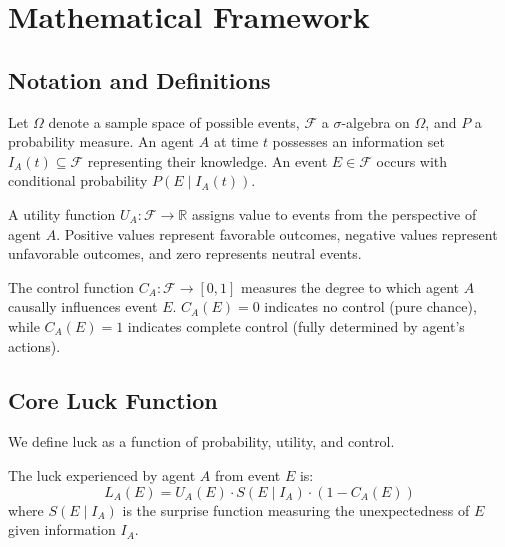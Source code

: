 \section{Mathematical Framework}
\label{sec:theory}

\subsection{Notation and Definitions}

Let $\Omega$ denote a sample space of possible events, $\mathcal{F}$ a $\sigma$-algebra
on $\Omega$, and $P$ a probability measure. An agent $A$ at time $t$ possesses
an information set $I_{A}(t) \subseteq \mathcal{F}$ representing their knowledge.
An event $E \in \mathcal{F}$ occurs with conditional probability
$P(E \mid I_{A}(t))$.

\begin{definition}
  A utility function $U_{A}: \mathcal{F}\to \mathbb{R}$ assigns value to
  events from the perspective of agent $A$. Positive values represent
  favorable outcomes, negative values represent unfavorable outcomes,
  and zero represents neutral events.
\end{definition}

\begin{definition}[Control]
  The control function $C_{A}: \mathcal{F}\to [0,1]$ measures the degree
  to which agent $A$ causally influences event $E$. $C_{A}(E) = 0$
  indicates no control (pure chance), while $C_{A}(E) = 1$ indicates complete
  control (fully determined by agent's actions).
\end{definition}

\subsection{Core Luck Function}

We define luck as a function of probability, utility, and control.

\begin{definition}[Luck]
  \label{def:luck} The luck experienced by agent $A$ from event $E$ is:
  \begin{equation}
    L_{A}(E) = U_{A}(E) \cdot S(E \mid I_{A}) \cdot (1 - C_{A}(E))
  \end{equation}
  where $S(E \mid I_{A})$ is the surprise function measuring the
  unexpectedness of $E$ given information $I_{A}$.
\end{definition}

